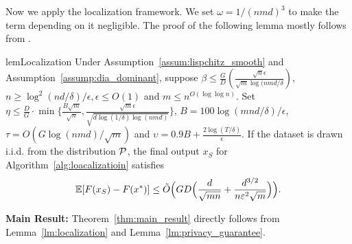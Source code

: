 Now we apply the localization framework.
We set $\omega=1/(nmd)^3$ to make the term depending on it negligible.
The proof of the following lemma mostly follows from \cite{FKT20}.

\begin{restatable}[Localization]{lem}{Localization}
    \label{lm:localization}
Under Assumption~\ref{assum:lispchitz_smooth} and Assumption~\ref{assump:dia_dominant}, suppose $\beta\le\frac{G}{D}(\frac{\sqrt{n}\epsilon}{\sqrt{m}\log(nmd/\delta})$, $n\ge \log^2(nd/\delta)/\epsilon, \epsilon\le O(1)$ and $ m\le n^{O(\log\log n)}$.
Set $\eta\le\frac{D}{G}\cdot \min\{ \frac{B\sqrt{m}}{\sqrt{n}} ,  \frac{\sqrt{m}\epsilon}{\sqrt{d\log(1/\delta)\log( nmd)}}\}$, $B=100\log(mnd/\delta)/\epsilon$, $\tau=O(G\log(nmd)/\sqrt{m})$ and $\upsilon=0.9B+\frac{2\log(T/\delta)}{\epsilon}$.
If the dataset is drawn i.i.d. from the distribution $\mathcal{P}$,
the final output $x_S$ for Algorithm~\ref{alg:loacalizatioin} satisfies
\begin{align*}
    \operatorname*{\mathbb{E}}[F(x_S)-F(x^*)]\le \Tilde{O}\Big(GD\Big(\frac{d}{\sqrt{mn}}+\frac{d^{3/2}}{n\varepsilon^2\sqrt{m}}\Big)\Big).
\end{align*}
\end{restatable}

\noindent\textbf{ Main Result:}
Theorem~\ref{thm:main_result} directly follows from Lemma~\ref{lm:localization} and Lemma~\ref{lm:privacy_guarantee}.




